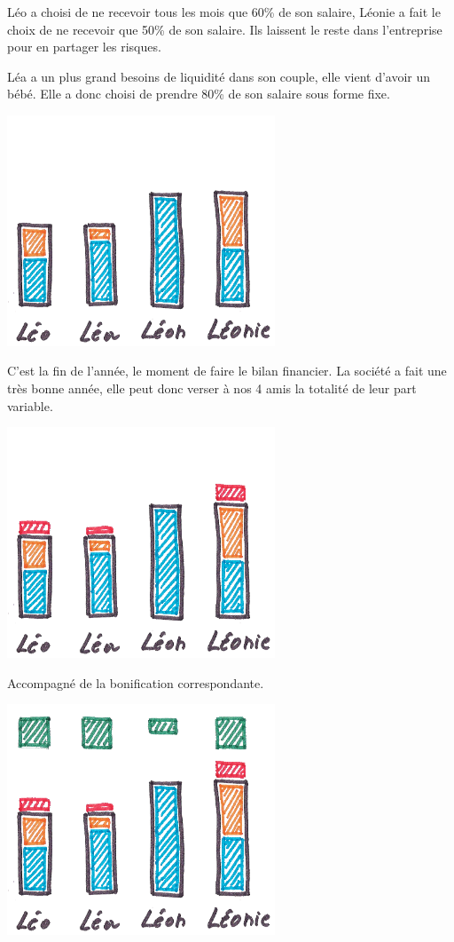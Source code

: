 \documentclass[12pt]{article}
\begin{document}
 Léo a choisi de ne recevoir tous les mois que 60\% de son salaire, Léonie a fait le choix de ne recevoir que 50\% de son salaire. Ils laissent le reste dans l’entreprise pour en partager les risques.

 Léa a un plus grand besoins de liquidité dans son couple, elle vient d’avoir un bébé. Elle a donc choisi de prendre 80\% de son salaire sous forme fixe.

 \begin{center}
 \includegraphics[width=0.6\textwidth]{includes/choix_part_variable}
 \end{center}

 C’est la fin de l’année, le moment de faire le bilan financier. La société a fait une très bonne année, elle peut donc verser à nos 4 amis la totalité de leur part variable.

 \begin{center}
 \includegraphics[width=0.6\textwidth]{includes/versement_bonification}
 \end{center}

 Accompagné de la bonification correspondante.

 \begin{center}
 \includegraphics[width=0.6\textwidth]{includes/versement_benefices}
 \end{center}
\end{document}
